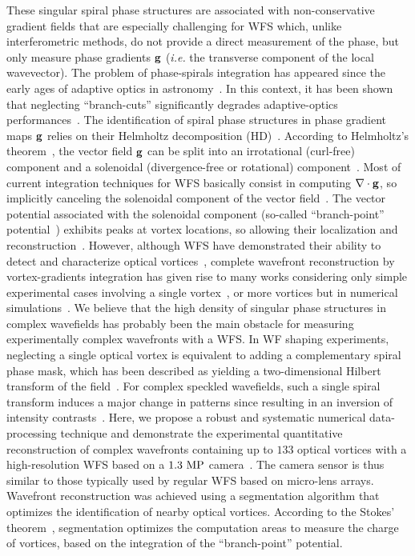 \documentclass[10pt,twocolumn,twoside,letterpaper]{article}
\begin{document}
These singular spiral phase structures are associated with non-conservative gradient fields that are especially challenging for WFS which, unlike interferometric methods, do not provide a direct measurement of the phase, but only measure phase gradients ${\bf g}$ (\emph{i.e.} the transverse component of the local wavevector). 
The problem of phase-spirals integration has appeared since the early ages of adaptive optics in astronomy~\cite{Fried_AO_92}. In this context, it has been shown that neglecting ``branch-cuts'' significantly degrades adaptive-optics performances~\cite{Tyler_JOSA_2000}. 
The identification of spiral phase structures in phase gradient maps ${\bf g}$ relies on their Helmholtz decomposition (HD)~\cite{LeBigot_OL_99,Tikhomirova_JOSA_02}. According to Helmholtz's theorem~\cite{Bremer_IEEE_13}, the vector field ${\bf g}$ can be split into an irrotational (curl-free) component and a solenoidal (divergence-free or rotational) component~\cite{Fried_JOSA_98,LeBigot_OL_99,Tyler_JOSA_2000,Senthilkumaran_JOSAA_12}. 
Most of current integration techniques for WFS basically consist in computing $\nabla\cdot {\bf g}$, 
so implicitly canceling the solenoidal component of the vector field~\cite{Huang2015}. The vector potential associated with the solenoidal component (so-called ``branch-point'' potential~\cite{Fried_JOSA_98,LeBigot_OL_99}) exhibits peaks at vortex locations, so allowing their localization and reconstruction~\cite{Tyler_JOSA_2000}. However, although WFS have demonstrated their ability to detect and characterize optical vortices~\cite{Fried_AO_92,Dainty_OE_12,Fallah_AO_15}, complete wavefront reconstruction by vortex-gradients integration has given rise to many works considering only simple experimental cases involving a single vortex~\cite{Soldatenkov_OL_07,Dainty_OE_10,Bai_OE_15}, or more vortices but in numerical simulations~\cite{Fried_AO_92,Fried_JOSA_98,Tyler_JOSA_2000,Olivier_JOSA_07,Soldatenkov_OL_07}. 
We believe that the high density of singular phase structures in complex wavefields has probably been the main obstacle for measuring experimentally complex wavefronts with a WFS. 
In WF shaping experiments, neglecting a single optical vortex is equivalent to adding a complementary spiral phase mask, which has been described as yielding a two-dimensional Hilbert transform of the field~\cite{Larkin_JOSA_01}. For complex speckled wavefields, such a single spiral transform induces a major change in patterns since resulting in an inversion of intensity contrasts~\cite{Gateau_PRL_17, Gateau_Optica_19}.
Here, we propose a robust and systematic numerical data-processing technique and demonstrate the experimental quantitative reconstruction of complex wavefronts containing up to $133$ optical vortices with a high-resolution WFS based on a $1.3~{\rm MP}$ camera~\cite{Berto_OL_17}. The camera sensor is thus similar to those typically used by regular WFS based on micro-lens arrays. Wavefront reconstruction was achieved using a segmentation algorithm that optimizes the identification of nearby optical vortices. According to the Stokes' theorem~\cite{Fried_JOSA_98}, segmentation optimizes the computation areas to measure the charge of vortices, based on the integration of the ``branch-point'' potential.
\end{document}
